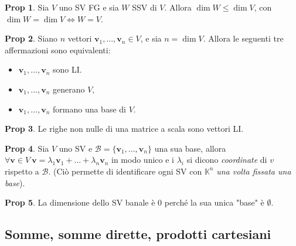 \documentclass[]{article}
\newcommand{\vv}{\mathbf{v}}
\theoremstyle{definition}
\theoremstyle{definition}
\newtheorem{prop}{Prop}[subsection]
\theoremstyle{definition}
\begin{document}
\begin{prop} Sia $V$ uno SV FG e sia $W$ SSV di $V$. Allora $\dim W \leq \dim V$, con $\dim W = \dim V \Leftrightarrow W=V$.

\end{prop} \begin{prop} Siano $n$ vettori $\vv _1 ,..., \vv _n \in V$, e sia $n=\dim V$. Allora le seguenti tre affermazioni sono equivalenti:
\begin{itemize}
\item $\vv _1 ,..., \vv _n$ sono LI.
\item $\vv _1 ,..., \vv _n$ generano $V$,
\item $\vv _1 ,..., \vv _n$ formano una base di $V$.
\end{itemize}

\end{prop} \begin{prop} Le righe non nulle di una matrice a scala sono vettori LI.

\end{prop} \begin{prop} Sia $V$ uno SV e $\mathcal{B} = \{ \vv _1 ,..., \vv _n \}$ una sua base, allora $\forall \vv \in V \ \vv = \lambda _1 \vv _1 + ... + \lambda _n \vv _n$ in modo unico e i $\lambda _i$ si dicono \emph{coordinate} di $v$ rispetto a $\mathcal{B}$. (Ciò permette di identificare ogni SV con $\mathbb{K}^n$ \emph{una volta fissata una base}).

\end{prop} \begin{prop} La dimensione dello SV banale è 0 perché la sua unica "base" è $\emptyset$.
\end{prop}

\subsection{Somme, somme dirette, prodotti cartesiani}
\end{document}
